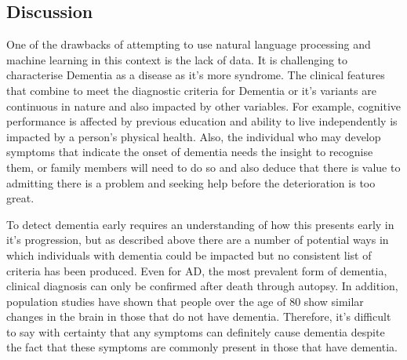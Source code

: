 \documentclass[12pt, twoside, a4paper]{article}
\begin{document}
\subsection{Discussion}
One of the drawbacks of attempting to use natural language processing and machine learning in this context is the lack of data.
It is challenging to characterise Dementia as a disease as it's more syndrome. The clinical features that combine to meet the diagnostic criteria for Dementia or it's variants are continuous in nature and also impacted by other variables. For example, cognitive performance is affected by previous education and ability to live independently is impacted by a person's physical health. Also, the individual who may develop symptoms that indicate the onset of dementia needs the insight to recognise them, or family members will need to do so and also deduce that there is value to admitting there is a problem and seeking help before the deterioration is too great.
\par
To detect dementia early requires an understanding of how this presents early in it's progression, but as described above there are a number of potential ways in which individuals with dementia could be impacted but no consistent list of criteria has been produced. Even for AD, the most prevalent form of dementia, clinical diagnosis can only be confirmed after death through autopsy. In addition, population studies have shown that people over the age of 80 show similar changes in the brain in those that do not have dementia. Therefore, it's difficult to say with certainty that any symptoms can definitely cause dementia despite the fact that these symptoms are commonly present in those that have dementia.
\par
\end{document}

